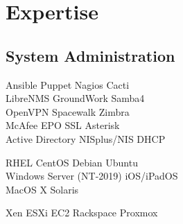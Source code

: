 \documentclass[letterpaper]{deedy-resume} %
\begin{document}
\begin{minipage}[t]{0.33\textwidth}



\section{Expertise}

\subsection{System Administration}
Ansible \textbullet{} Puppet \textbullet{} Nagios \textbullet{} Cacti \\
LibreNMS \textbullet{} GroundWork \textbullet{} Samba4 \\
OpenVPN \textbullet{} Spacewalk \textbullet{} Zimbra \\
McAfee EPO \textbullet{} SSL \textbullet{} Asterisk \\
Active Directory \textbullet{} NISplus/NIS \textbullet{} DHCP \\

\sectionspace %

RHEL \textbullet{} CentOS \textbullet{} Debian \textbullet{} Ubuntu \\
Windows Server (NT-2019) \textbullet{} iOS/iPadOS \\
MacOS X \textbullet{} Solaris %

\sectionspace %

Xen \textbullet{} ESXi \textbullet{} EC2 \textbullet{} Rackspace \textbullet{} Proxmox \\

\sectionspace %


\end{minipage}
\end{document}
